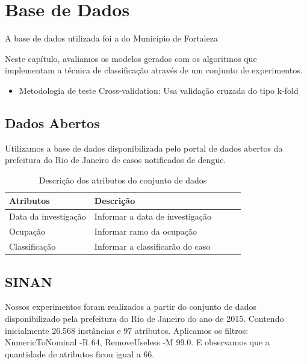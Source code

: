 \documentclass[
	12pt,				%
	openright,			%
	oneside,	
	a4paper,				%
	english,				%
	brazil				%
]{abntex2/abntex2} %
\begin{document}
\chapter{Base de Dados}

	A base de dados utilizada foi a do Município de Fortaleza
	
	Neste capítulo, avaliamos os modelos gerados com os algoritmos que implementam a técnica de classificação através de um conjunto de experimentos.

	\begin{itemize}
		\item Metodologia de teste Cross-validation: Usa validação cruzada do tipo k-fold
	\end{itemize}

	
	\section{Dados Abertos}
	
	Utilizamos a base de dados disponibilizada pelo portal de dados abertos da prefeitura do Rio de Janeiro de casos notificados de dengue.

		\begin{table}[]
			\caption{Descrição dos atributos do conjunto de dados}
			\label{tabelaDescricaoAtributos}
			\centering
			\label{my-label}
			\begin{tabular}{@{}lllll@{}}
				\toprule
				Atributos            & Descrição                        &  &  &  \\ \midrule
				Data da investigação & Informar a data de investigação  &  &  &  \\
				Ocupação             & Informar ramo da ocupação        &  &  &  \\
				Classificação        & Informar a classificarão do caso &  &  &  \\ \bottomrule
			\end{tabular}
		\end{table}
		
		
	\section{SINAN}
	
		Nossos experimentos foram realizados a partir do conjunto de dados disponibilizado pela prefeitura do Rio de Janeiro do ano de 2015. Contendo inicialmente 26.568 instâncias e 97 atributos.
		Aplicamos os filtros: NumericToNominal -R 64, RemoveUseless -M 99.0. E observamos que a quantidade de atributos ficou igual a 66.
		
\end{document}
